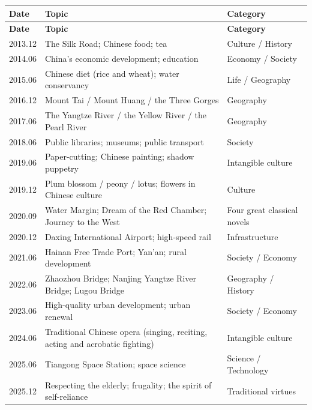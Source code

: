 \begin{center}
\small
\begin{longtable}{p{2.3cm}p{6.2cm}p{6.2cm}}
\toprule
\textbf{Date} & \textbf{Topic} & \textbf{Category} \\
\midrule
\endfirsthead
\toprule
\textbf{Date} & \textbf{Topic} & \textbf{Category} \\
\midrule
\endhead
2013.12 & The Silk Road; Chinese food; tea & Culture / History \\
\midrule
2014.06 & China's economic development; education & Economy / Society \\
\midrule
2015.06 & Chinese diet (rice and wheat); water conservancy & Life / Geography \\
\midrule
2016.12 & Mount Tai / Mount Huang / the Three Gorges & Geography \\
\midrule
2017.06 & The Yangtze River / the Yellow River / the Pearl River & Geography \\
\midrule
2018.06 & Public libraries; museums; public transport & Society \\
\midrule
2019.06 & Paper-cutting; Chinese painting; shadow puppetry & Intangible culture \\
\midrule
2019.12 & Plum blossom / peony / lotus; flowers in Chinese culture & Culture \\
\midrule
2020.09 & Water Margin; Dream of the Red Chamber; Journey to the West & Four great classical novels \\
\midrule
2020.12 & Daxing International Airport; high-speed rail & Infrastructure \\
\midrule
2021.06 & Hainan Free Trade Port; Yan'an; rural development & Society / Economy \\
\midrule
2022.06 & Zhaozhou Bridge; Nanjing Yangtze River Bridge; Lugou Bridge & Geography / History \\
\midrule
2023.06 & High-quality urban development; urban renewal & Society / Economy \\
\midrule
2024.06 & Traditional Chinese opera (singing, reciting, acting and acrobatic fighting) & Intangible culture \\
\midrule
2025.06 & Tiangong Space Station; space science & Science / Technology \\
\midrule
2025.12 & Respecting the elderly; frugality; the spirit of self-reliance & Traditional virtues \\
\bottomrule
\end{longtable}
\end{center}


